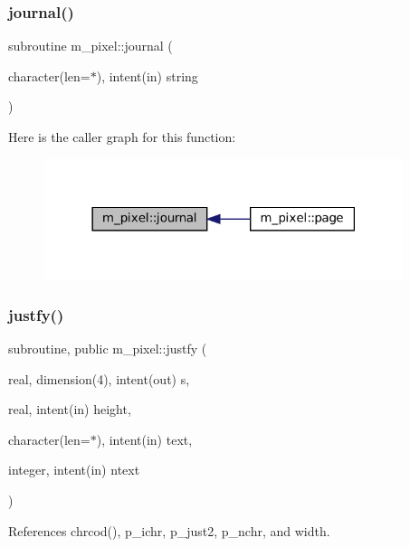 \subsubsection{\texorpdfstring{journal()}{journal()}}
{\footnotesize\ttfamily subroutine m\+\_\+pixel\+::journal (\begin{DoxyParamCaption}\item[{character(len=$\ast$), intent(in)}]{string }\end{DoxyParamCaption})\hspace{0.3cm}{\ttfamily [private]}}

Here is the caller graph for this function\+:
\nopagebreak
\begin{figure}[H]
\begin{center}
\leavevmode
\includegraphics[width=297pt]{namespacem__pixel_ac39c9efa849915aff58657e2df03fe3c_icgraph}
\end{center}
\end{figure}
\mbox{\label{namespacem__pixel_a7b08886c913b47694edeb60fa747afc4}} 
\subsubsection{\texorpdfstring{justfy()}{justfy()}}
{\footnotesize\ttfamily subroutine, public m\+\_\+pixel\+::justfy (\begin{DoxyParamCaption}\item[{real, dimension(4), intent(out)}]{s,  }\item[{real, intent(in)}]{height,  }\item[{character(len=$\ast$), intent(in)}]{text,  }\item[{integer, intent(in)}]{ntext }\end{DoxyParamCaption})}



References chrcod(), p\+\_\+ichr, p\+\_\+just2, p\+\_\+nchr, and width.

